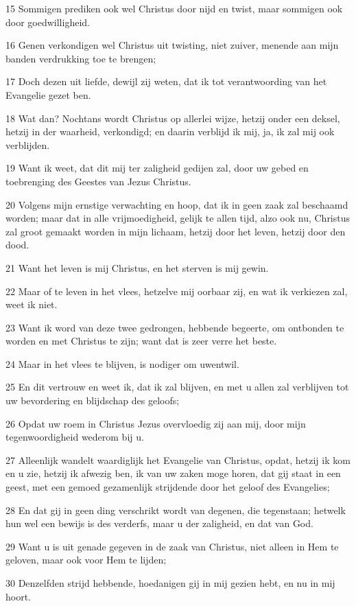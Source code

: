 \par 15 Sommigen prediken ook wel Christus door nijd en twist, maar sommigen ook door goedwilligheid.
\par 16 Genen verkondigen wel Christus uit twisting, niet zuiver, menende aan mijn banden verdrukking toe te brengen;
\par 17 Doch dezen uit liefde, dewijl zij weten, dat ik tot verantwoording van het Evangelie gezet ben.
\par 18 Wat dan? Nochtans wordt Christus op allerlei wijze, hetzij onder een deksel, hetzij in der waarheid, verkondigd; en daarin verblijd ik mij, ja, ik zal mij ook verblijden.
\par 19 Want ik weet, dat dit mij ter zaligheid gedijen zal, door uw gebed en toebrenging des Geestes van Jezus Christus.
\par 20 Volgens mijn ernstige verwachting en hoop, dat ik in geen zaak zal beschaamd worden; maar dat in alle vrijmoedigheid, gelijk te allen tijd, alzo ook nu, Christus zal groot gemaakt worden in mijn lichaam, hetzij door het leven, hetzij door den dood.
\par 21 Want het leven is mij Christus, en het sterven is mij gewin.
\par 22 Maar of te leven in het vlees, hetzelve mij oorbaar zij, en wat ik verkiezen zal, weet ik niet.
\par 23 Want ik word van deze twee gedrongen, hebbende begeerte, om ontbonden te worden en met Christus te zijn; want dat is zeer verre het beste.
\par 24 Maar in het vlees te blijven, is nodiger om uwentwil.
\par 25 En dit vertrouw en weet ik, dat ik zal blijven, en met u allen zal verblijven tot uw bevordering en blijdschap des geloofs;
\par 26 Opdat uw roem in Christus Jezus overvloedig zij aan mij, door mijn tegenwoordigheid wederom bij u.
\par 27 Alleenlijk wandelt waardiglijk het Evangelie van Christus, opdat, hetzij ik kom en u zie, hetzij ik afwezig ben, ik van uw zaken moge horen, dat gij staat in een geest, met een gemoed gezamenlijk strijdende door het geloof des Evangelies;
\par 28 En dat gij in geen ding verschrikt wordt van degenen, die tegenstaan; hetwelk hun wel een bewijs is des verderfs, maar u der zaligheid, en dat van God.
\par 29 Want u is uit genade gegeven in de zaak van Christus, niet alleen in Hem te geloven, maar ook voor Hem te lijden;
\par 30 Denzelfden strijd hebbende, hoedanigen gij in mij gezien hebt, en nu in mij hoort.

